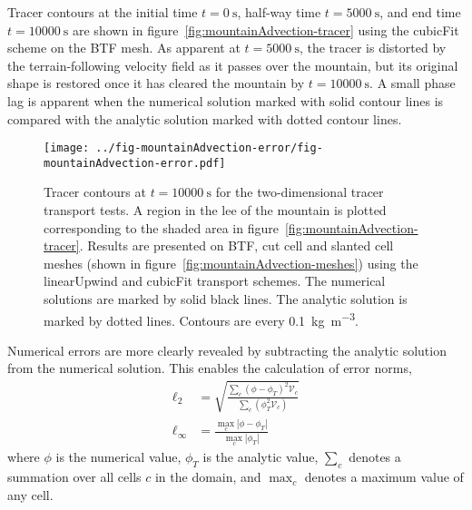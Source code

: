 Tracer contours at the initial time $t=\SI{0}{\second}$, half-way time $t=\SI{5000}{\second}$, and end time $t=\SI{10000}{\second}$ are shown in figure~\ref{fig:mountainAdvection-tracer} using the cubicFit scheme on the BTF mesh.  As apparent at $t=\SI{5000}{\second}$, the tracer is distorted by the terrain-following velocity field as it passes over the mountain, but its original shape is restored once it has cleared the mountain by $t=\SI{10000}{\second}$.
A small phase lag is apparent when the numerical solution marked with solid contour lines is compared with the analytic solution marked with dotted contour lines.

\begin{figure}
	\centering
	\texttt{[image: ../fig-mountainAdvection-error/fig-mountainAdvection-error.pdf]}
	\caption{Tracer contours at $t=\SI{10000}{\second}$ for the two-dimensional tracer transport tests.  A region in the lee of the mountain is plotted corresponding to the shaded area in figure~\ref{fig:mountainAdvection-tracer}.  Results are presented on BTF, cut cell and slanted cell meshes (shown in figure~\ref{fig:mountainAdvection-meshes}) using the linearUpwind and cubicFit transport schemes.  The numerical solutions are marked by solid black lines.  The analytic solution is marked by dotted lines.  Contours are every \SI{0.1}{\kilo\gram\per\meter\cubed}.}
	\label{fig:mountainAdvection-errors}
\end{figure}

Numerical errors are more clearly revealed by subtracting the analytic solution from the numerical solution.  This enables the calculation of error norms,
\begin{align}
	\ell_2 &= \sqrt{\frac{\sum_c \left(\phi - \phi_T \right)^2 \mathcal{V}_c}{\sum_c \left(\phi_T^2 \mathcal{V}_c \right)}} \\
	\ell_\infty &= \frac{\max_c |\phi - \phi_T|}{\max_c |\phi_T|}
\end{align}
where $\phi$ is the numerical value, $\phi_T$ is the analytic value, $\sum_c$ denotes a summation over all cells $c$ in the domain, and $\max_c$ denotes a maximum value of any cell.

